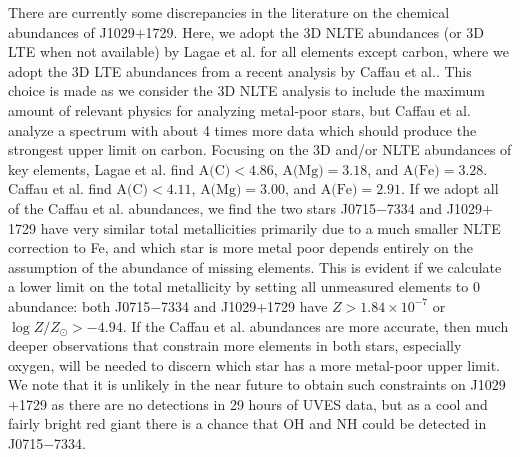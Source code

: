 \documentclass{natureprintstyle}
\newcommand{\logzzsun}{\ensuremath{\log Z/Z_\odot}\xspace}
\newcommand{\umpstar}{J0715$-$7334\xspace}
\newcommand{\caffaustar}{J1029$+$1729\xspace}
\begin{document}
There are currently some discrepancies in the literature on the chemical abundances of \caffaustar. Here, we adopt the 3D NLTE abundances (or 3D LTE when not available) by Lagae et al.\cite{Lagae2023} for all elements except carbon, where we adopt the 3D LTE abundances from a recent analysis by Caffau et al.\cite{Caffau2024}. This choice is made as we consider the 3D NLTE analysis to include the maximum amount of relevant physics for analyzing metal-poor stars, but Caffau et al. analyze a spectrum with about 4 times more data which should produce the strongest upper limit on carbon.
Focusing on the 3D and/or NLTE abundances of key elements, Lagae et al. find $\mbox{A(C)} < 4.86$, $\mbox{A(Mg)} = 3.18$, and $\mbox{A(Fe)} = 3.28$. Caffau et al. find $\mbox{A(C)} < 4.11$, $\mbox{A(Mg)} = 3.00$, and $\mbox{A(Fe)} = 2.91$. If we adopt all of the Caffau et al. abundances, we find the two stars \umpstar and \caffaustar have very similar total metallicities primarily due to a much smaller NLTE correction to Fe, and which star is more metal poor depends entirely on the assumption of the abundance of missing elements. This is evident if we calculate a lower limit on the total metallicity by setting all unmeasured elements to 0 abundance: both \umpstar and \caffaustar have $Z > 1.84 \times 10^{-7}$ or $\logzzsun > -4.94$. If the Caffau et al. abundances are more accurate, then much deeper observations that constrain more elements in both stars, especially oxygen, will be needed to discern which star has a more metal-poor upper limit.
We note that it is unlikely in the near future to obtain such constraints on \caffaustar as there are no detections in 29 hours of UVES data, but as a cool and fairly bright red giant there is a chance that OH and NH could be detected in \umpstar.
\end{document}

